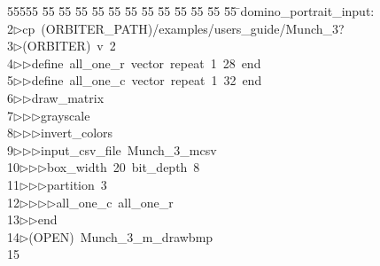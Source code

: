 %
%
\begin{tabbing}
55555 \= 55 \= 55 \= 55 \= 55 \= 55 \= 55 \= 55 \= 55 \= 55 \= 55 \= 55 \= 55 \= \>domino\_portrait\_input:\\[0pt]
2\>$\triangleright$\>cp\ (ORBITER\_PATH)/examples/users\_guide/Munch\_3?\ \\[0pt]
3\>$\triangleright$\>(ORBITER)\ v\ 2\ \\[0pt]
4\>$\triangleright$\>$\triangleright$\>define\ all\_one\_r\ vector\ repeat\ 1\ 28\ end\ \\[0pt]
5\>$\triangleright$\>$\triangleright$\>define\ all\_one\_c\ vector\ repeat\ 1\ 32\ end\ \\[0pt]
6\>$\triangleright$\>$\triangleright$\>draw\_matrix\ \\[0pt]
7\>$\triangleright$\>$\triangleright$\>$\triangleright$\>grayscale\ \\[0pt]
8\>$\triangleright$\>$\triangleright$\>$\triangleright$\>invert\_colors\ \\[0pt]
9\>$\triangleright$\>$\triangleright$\>$\triangleright$\>input\_csv\_file\ Munch\_3\_mcsv\ \\[0pt]
10\>$\triangleright$\>$\triangleright$\>$\triangleright$\>box\_width\ 20\ bit\_depth\ 8\ \\[0pt]
11\>$\triangleright$\>$\triangleright$\>$\triangleright$\>partition\ 3\ \\[0pt]
12\>$\triangleright$\>$\triangleright$\>$\triangleright$\>$\triangleright$\>all\_one\_c\ all\_one\_r\ \\[0pt]
13\>$\triangleright$\>$\triangleright$\>end\\[0pt]
14\>$\triangleright$\>(OPEN)\ Munch\_3\_m\_drawbmp\\[0pt]
15\>\end{tabbing}
